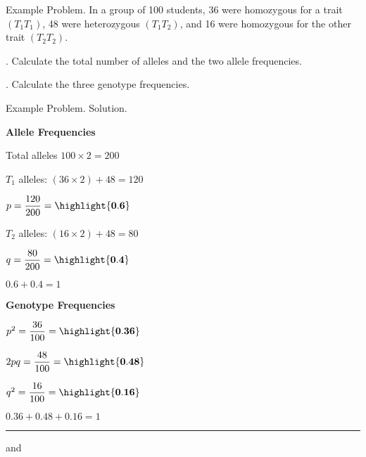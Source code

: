 \documentclass[t]{beamer}
\begin{document}
\begin{frame}{Example Problem. }
	\hangpara In a group of 100 students, 36 were homozygous for a trait $(T_1T_1)$, 48 were heterozygous $(T_1T_2)$, and 16 were homozygous for the other trait $(T_2T_2)$.

	. Calculate the total number of alleles and the two allele frequencies.

	. Calculate the three genotype frequencies.

\end{frame}
%
{
\begin{frame}{Example Problem. Solution.}
\begin{multicols}{2}

	\hangpara \textbf{Allele Frequencies}
	
	\hangpara Total alleles $100 \times 2 = 200$
	
	\hangpara $T_1$ alleles: $(36 \times 2) + 48 = 120$
	
	\hangpara $p = \dfrac{120}{200} = \highlight{\mathbf{0.6}}$

	\hangpara $T_2$ alleles: $(16 \times 2) + 48 = 80$ 

	\hangpara $q = \dfrac{80}{200} = \highlight{\mathbf{0.4}}$
	
	\hangpara $0.6 + 0.4 = 1$ \checkmark

\columnbreak

	\hangpara \textbf{Genotype Frequencies}
	
	\hangpara $p^2=  \dfrac{36}{100} =\highlight{\mathbf{0.36}}$  

	\hangpara $2pq = \dfrac{48}{100} = \highlight{\mathbf{0.48}}$

	\hangpara $q^2 = \dfrac{16}{100} = \highlight{\mathbf{0.16}}$

	\hangpara $0.36 + 0.48 + 0.16 = 1$ \checkmark
	
	\rule{0.4\textwidth}{0.1pt}\vspace{-0.5\baselineskip}
	
	\hangpara {} and
	

\end{multicols}

\end{frame}
}
\end{document}
